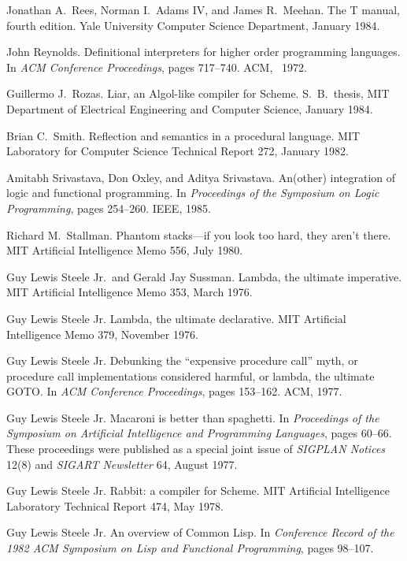 \begin{thebibliography}{99}
Jonathan A.~Rees, Norman I.~Adams IV, and James R.~Meehan.
The T manual, fourth edition.
Yale University Computer Science Department, January 1984.

John Reynolds.
Definitional interpreters for higher order programming languages.
In {\em ACM Conference Proceedings}, pages 717--740.
ACM, ~1972.

Guillermo J.~Rozas.
Liar, an Algol-like compiler for Scheme.
S.~B.~thesis, MIT Department of Electrical Engineering and Computer
  Science, January 1984.

Brian C.~Smith.
Reflection and semantics in a procedural language.
MIT Laboratory for Computer Science Technical Report 272, January 1982.

Amitabh Srivastava, Don Oxley, and Aditya Srivastava.
An(other) integration of logic and functional programming.
In {\em Proceedings of the Symposium on Logic Programming}, pages 254--260. 
IEEE, 1985.

Richard M.~Stallman.
Phantom stacks---if you look too hard, they aren't there.
MIT Artificial Intelligence Memo 556, July 1980.

Guy Lewis Steele Jr.~and Gerald Jay Sussman.
Lambda, the ultimate imperative.
MIT Artificial Intelligence Memo 353, March 1976.

Guy Lewis Steele Jr.
Lambda, the ultimate declarative.
MIT Artificial Intelligence Memo 379, November 1976.

Guy Lewis Steele Jr.
Debunking the ``expensive procedure call'' myth, or procedure call
  implementations considered harmful, or lambda, the ultimate GOTO.
In {\em ACM Conference Proceedings}, pages 153--162.
ACM, 1977.

Guy Lewis Steele Jr.
Macaroni is better than spaghetti.
In {\em Proceedings of the Symposium on Artificial Intelligence and
  Programming Languages}, pages 60--66.
These proceedings were published as a special joint issue of {\em
  SIGPLAN Notices} 12(8) and {\em SIGART Newsletter} 64, August 1977.

Guy Lewis Steele Jr.
Rabbit: a compiler for Scheme.
MIT Artificial Intelligence Laboratory Technical Report 474, May 1978.

Guy Lewis Steele Jr.
An overview of Common Lisp.
In {\em Conference Record of the 1982 ACM Symposium on Lisp and
  Functional Programming}, pages 98--107.


\end{thebibliography}
